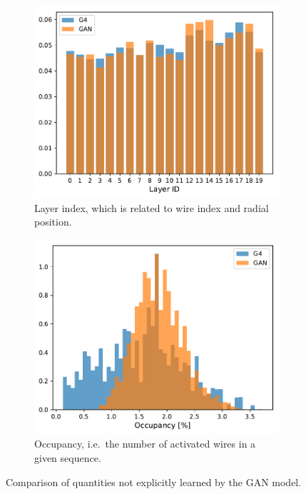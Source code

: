 \begin{figure}
    \centering
    \begin{subfigure}[t]{0.38\textwidth}
        \centering
        \hspace{-.5cm} %
        \includegraphics[width=\textwidth]{chapter4/comp_layer.pdf}
        \caption{Layer index, which is related to wire index and radial position.}
    \end{subfigure}
    \hspace{2cm}
    \begin{subfigure}[t]{0.38\textwidth}
        \centering
        \hspace{-.5cm} %
        \includegraphics[width=\textwidth]{chapter4/occupancy.pdf}
        \caption{Occupancy, i.e.\ the number of activated wires in a given sequence.}
    \end{subfigure}
    \caption{
        Comparison of quantities not explicitly learned by the GAN model.
    }
    \label{fig:comp_nonlearned}
\end{figure}


